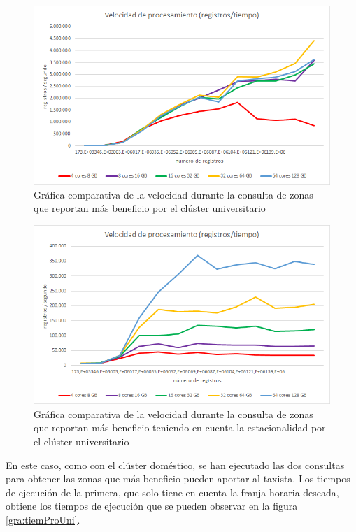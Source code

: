 \begin{figure}[htp!]
	\centering
	\caption{Gráfica comparativa de la velocidad durante la consulta de zonas que reportan más beneficio por el clúster universitario}
	\label{gra:velProUni}
	\vspace{5pt}
	\includegraphics[scale=0.85]{graficas/vbuni}
\end{figure}
\begin{figure}[htp!]
	\centering
	\caption{Gráfica comparativa de la velocidad durante la consulta de zonas que reportan más beneficio teniendo en cuenta la estacionalidad por el clúster universitario}
	\label{gra:velProDayUni}
	\vspace{5pt}
	\includegraphics[scale=0.85]{graficas/vbduni}
\end{figure}

En este caso, como con el clúster doméstico, se han ejecutado las dos consultas para obtener las zonas que más beneficio pueden aportar al taxista. Los tiempos de ejecución de la primera, que solo tiene en cuenta la franja horaria deseada, obtiene los tiempos de ejecución que se pueden observar en la figura \ref{gra:tiemProUni}.

